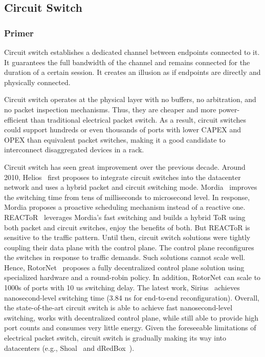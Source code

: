 
\subsection{Circuit Switch}

\subsubsection{Primer}

Circuit switch establishes a dedicated channel between
endpoints connected to it. It guarantees the full bandwidth
of the channel and remains connected for the duration of a
certain session. It creates an illusion as if endpoints are
directly and physically connected.

Circuit switch operates at the physical layer with no buffers,
no arbitration, and no packet inspection mechanisms.
Thus, they are cheaper and more power-efficient than
traditional electrical packet switch. As a result,
circuit switches could support hundreds or even thousands of
ports with lower CAPEX and OPEX than equivalent packet switches,
making it a good candidate to interconnect disaggregated devices in a rack.

Circuit switch has seen great improvement over the previous decade.
Around 2010, Helios~\cite{helios-sigcomm10} first proposes to integrate circuit switches into
the datacenter network and uses a hybrid packet and circuit switching mode.
Mordia~\cite{mordia-sigcomm13} improves the switching time from
tens of milliseconds to microsecond level. In response, Mordia proposes
a proactive scheduling mechanism instead of a reactive one.
REACToR~\cite{reactor-nsdi14} leverages Mordia's fast switching and builds a hybrid
ToR using both packet and circuit switches, enjoy the benefits of both.
But REACToR is sensitive to the traffic pattern.
Until then, circuit switch solutions were tightly coupling
their data plane with the control plane. The control plane
reconfigures the switches in response to traffic demands.
Such solutions cannot scale well.
Hence, RotorNet~\cite{rotornet-sigcomm17} proposes a fully decentralized
control plane solution using specialized hardware and a round-robin policy.
In addition, RotorNet can scale to 1000s of ports with 10 us switching delay.
The latest work, Sirius~\cite{sirius-sigcomm20} achieves nanosecond-level
switching time (3.84 ns for end-to-end reconfiguration).
Overall, the state-of-the-art circuit switch is able to
achieve fast nanosecond-level switching, works with decentralized control plane,
while still able to provide high port counts and consumes very little energy.
Given the foreseeable limitations of electrical packet switch,
circuit switch is gradually making its way into datacenters (e.g., Shoal~\cite{shoal-nsdi19} and dRedBox~\cite{dRedBox-DATE}).

